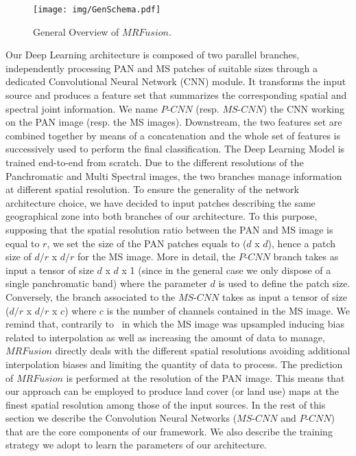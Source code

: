 \documentclass[journal]{IEEEtran}
\newcommand{\method}{$MRFusion$}
\begin{document}
\begin{figure}[ht!]
\centering
\texttt{[image: img/GenSchema.pdf]}
\caption{ \label{fig:Overview} General Overview of \method. }
\end{figure}

Our Deep Learning architecture is composed of two parallel branches, independently processing PAN and MS patches of suitable sizes through a dedicated Convolutional Neural Network (CNN) module. It transforms the input source and produces a feature set that summarizes the corresponding spatial and spectral joint information. We name $P$-$CNN$ (resp. $MS$-$CNN$) the CNN working on the PAN image (resp. the MS images).
Downstream, the two features set are combined together by means of a concatenation and the whole set of features is successively used to perform the final classification. The Deep Learning Model is trained end-to-end from scratch.
Due to the different resolutions of the Panchromatic and Multi Spectral images, the two branches manage information at different spatial resolution. To ensure the generality of the network architecture choice, we have decided to input patches describing the same geographical zone into both branches of our architecture.
To this purpose, supposing that the spatial resolution ratio between the PAN and MS image is equal to $r$, we set the size of the PAN patches equals to ($d$ x $d$), hence a patch size of $d/r$ x $d/r$ for the MS image. More in detail, the $P$-$CNN$ branch takes as input a tensor of size $d$ x $d$ x 1 (since in the general case we only dispose of a single panchromatic band) where the parameter $d$ is used to define the patch size. Conversely, the branch associated to the $MS$-$CNN$ takes as input a tensor of size ($d/r$ x $d/r$ x $c$) where $c$ is the number of channels contained in the MS image.
We remind that, contrarily to~\cite{LiuJZZZLYT18} in which the MS image was upsampled inducing bias related to interpolation as well as increasing the amount of data to manage, \method{} directly deals with the different spatial resolutions avoiding additional interpolation biases and limiting the quantity of data to process. The prediction of \method{} is performed at the resolution of the PAN image. This means that our approach can be employed to produce land cover (or land use) maps at the finest spatial resolution among those of the input sources.
In the rest of this section we describe the Convolution Neural Networks ($MS$-$CNN$ and $P$-$CNN$) that are the core components of our framework. We also describe the training strategy we adopt to learn the parameters of our architecture.
\end{document}
